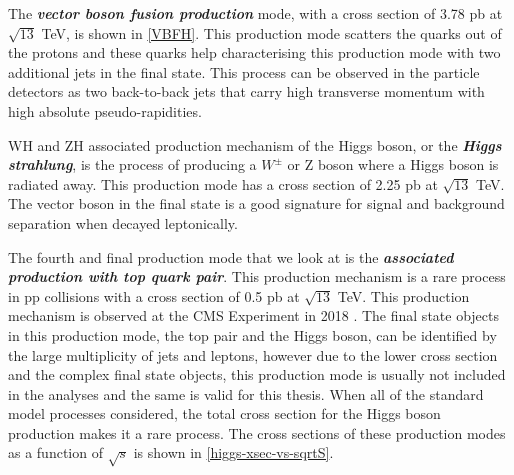 The \textbf{\emph{vector boson fusion production}} mode, with a cross section of 3.78 pb at $\sqrt{13}$ TeV, is shown in \autoref{VBFH}. This production mode scatters the quarks out of the protons and these quarks help characterising this production mode with two additional jets in the final state. This process can be observed in the particle detectors as two back-to-back jets that carry high transverse momentum with high absolute pseudo-rapidities.

WH and ZH associated production mechanism of the Higgs boson, or the \textbf{\emph{Higgs strahlung}}, is the process of producing a $W^\pm$ or Z boson where a Higgs boson is radiated away. This production mode has a cross section of 2.25 pb at $\sqrt{13}$ TeV. The vector boson in the final state is a good signature for signal and background separation when decayed leptonically.

The fourth and final production mode that we look at is the \textbf{\emph{associated production with top quark pair}}. This production mechanism is a rare process in pp collisions with a cross section of 0.5 pb at $\sqrt{13}$ TeV. This production mechanism is observed at the CMS Experiment in 2018 \cite{ttH-higgs}. The final state objects in this production mode, the top pair and the Higgs boson, can be identified by the large multiplicity of jets and leptons, however due to the lower cross section and the complex final state objects, this production mode is usually not included in the analyses and the same is valid for this thesis. When all of the standard model processes considered, the total cross section for the Higgs boson production makes it a rare process. The cross sections of these production modes as a function of $\sqrt{s}$ is shown in \autoref{higgs-xsec-vs-sqrtS}.

